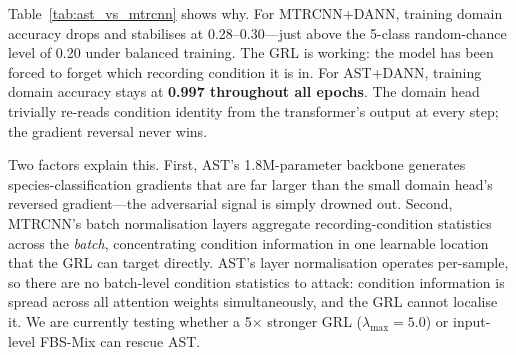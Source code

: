 Table~\ref{tab:ast_vs_mtrcnn} shows why.
For MTRCNN+DANN, training domain accuracy drops and stabilises at
0.28--0.30---just above the 5-class random-chance level of 0.20 under
balanced training.
The GRL is working: the model has been forced to forget which
recording condition it is in.
For AST+DANN, training domain accuracy stays at \textbf{0.997
throughout all epochs}.
The domain head trivially re-reads condition identity from the
transformer's output at every step; the gradient reversal never
wins.

\begin{table}[h]
  \centering
  \caption{Per-fold $\BAu$ (seed~42) and training domain accuracy.
           $^\dagger$Training domain accuracy under balanced training;
           5-class uniform chance = 0.20.
           MTRCNN+DANN reaches near-chance; AST+DANN stays at 0.997.}
  \label{tab:ast_vs_mtrcnn}
  \setlength{\tabcolsep}{4pt}
\end{table}

Two factors explain this.
First, AST's 1.8M-parameter backbone generates species-classification
gradients that are far larger than the small domain head's reversed
gradient---the adversarial signal is simply drowned out.
Second, MTRCNN's batch normalisation layers aggregate
recording-condition statistics across the \emph{batch}, concentrating
condition information in one learnable location that the GRL can
target directly.
AST's layer normalisation operates per-sample, so there are no
batch-level condition statistics to attack: condition information
is spread across all attention weights simultaneously, and the GRL
cannot localise it.
We are currently testing whether a 5$\times$ stronger GRL
($\lambda_{\max}{=}5.0$) or input-level FBS-Mix can rescue AST.


